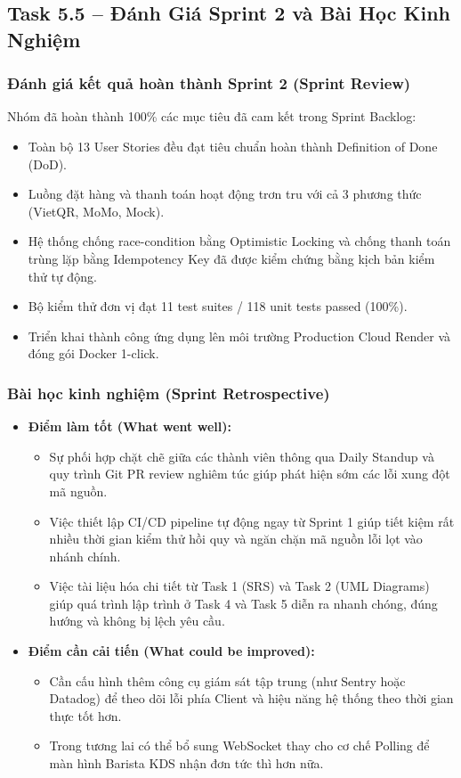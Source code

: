 \documentclass[11pt,a4paper]{article}
\begin{document}
\subsection{Task 5.5 -- Đánh Giá Sprint 2 và Bài Học Kinh Nghiệm}

\subsubsection{Đánh giá kết quả hoàn thành Sprint 2 (Sprint Review)}
Nhóm đã hoàn thành 100\% các mục tiêu đã cam kết trong Sprint Backlog:
\begin{itemize}[leftmargin=*]
    \item Toàn bộ 13 User Stories đều đạt tiêu chuẩn hoàn thành Definition of Done (DoD).
    \item Luồng đặt hàng và thanh toán hoạt động trơn tru với cả 3 phương thức (VietQR, MoMo, Mock).
    \item Hệ thống chống race-condition bằng Optimistic Locking và chống thanh toán trùng lặp bằng Idempotency Key đã được kiểm chứng bằng kịch bản kiểm thử tự động.
    \item Bộ kiểm thử đơn vị đạt 11 test suites / 118 unit tests passed (100\%).
    \item Triển khai thành công ứng dụng lên môi trường Production Cloud Render và đóng gói Docker 1-click.
\end{itemize}

\subsubsection{Bài học kinh nghiệm (Sprint Retrospective)}
\begin{itemize}[leftmargin=*]
    \item \textbf{Điểm làm tốt (What went well):}
    \begin{itemize}[leftmargin=*,noitemsep]
        \item Sự phối hợp chặt chẽ giữa các thành viên thông qua Daily Standup và quy trình Git PR review nghiêm túc giúp phát hiện sớm các lỗi xung đột mã nguồn.
        \item Việc thiết lập CI/CD pipeline tự động ngay từ Sprint 1 giúp tiết kiệm rất nhiều thời gian kiểm thử hồi quy và ngăn chặn mã nguồn lỗi lọt vào nhánh chính.
        \item Việc tài liệu hóa chi tiết từ Task 1 (SRS) và Task 2 (UML Diagrams) giúp quá trình lập trình ở Task 4 và Task 5 diễn ra nhanh chóng, đúng hướng và không bị lệch yêu cầu.
    \end{itemize}
    \item \textbf{Điểm cần cải tiến (What could be improved):}
    \begin{itemize}[leftmargin=*,noitemsep]
        \item Cần cấu hình thêm công cụ giám sát tập trung (như Sentry hoặc Datadog) để theo dõi lỗi phía Client và hiệu năng hệ thống theo thời gian thực tốt hơn.
        \item Trong tương lai có thể bổ sung WebSocket thay cho cơ chế Polling để màn hình Barista KDS nhận đơn tức thì hơn nữa.
    \end{itemize}
\end{itemize}
\clearpage
\end{document}
